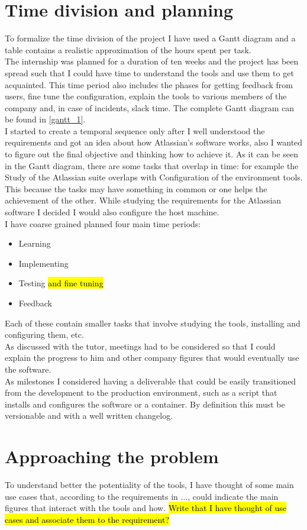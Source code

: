 \section{Time division and planning}
	To formalize the time division of the project I have used a Gantt diagram and a table contains a realistic approximation of the hours spent per task.\\
	The internship was planned for a duration of ten weeks and the project has been spread such that I could have time to understand the tools and use them to get acquainted.
	This time period also includes the phases for getting feedback from users, fine tune the configuration, explain the tools to various members of the company and, in case of incidents, slack time.
	The complete Gantt diagram can be found in \ref{gantt_1}.\\
	I started to create a temporal sequence only after I well understood the requirements and got an idea about how Atlassian's software works, also I wanted to figure out the final objective and thinking how to achieve it.
	As it can be seen in the Gantt diagram, there are some tasks that overlap in time: for example the Study of the Atlassian suite overlaps with Configuration of the environment tools.
	This because the tasks may have something in common or one helps the achievement of the other.
	While studying the requirements for the Atlassian software I decided I would also configure the host machine.\\
	I have coarse grained planned four main time periods:
	\begin{itemize}
		\item Learning
		\item Implementing
		\item Testing \hl{and fine tuning}
		\item Feedback
	\end{itemize}
	Each of these contain smaller tasks that involve studying the tools, installing and configuring them, etc.\\
	As discussed with the tutor, meetings had to be considered so that I could explain the progress to him and other company figures that would eventually use the software.\\
	As milestones I considered having a deliverable that could be easily transitioned from the development to the production environment, such as a script that installs and configures the software or a container.
	By definition this must be versionable and with a well written changelog.
	
\section{Approaching the problem}
	To understand better the potentiality of the tools, I have thought of some main use cases that, according to the requirements in ..., could indicate the main figures that interact with the tools and how.
	\hl{Write that I have thought of use cases and associate them to the requirement?}

	
	